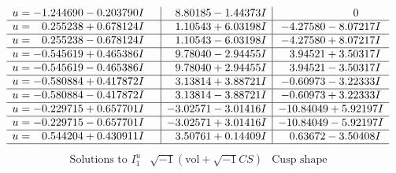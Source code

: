 \documentclass[1p]{elsarticle_modified}
\theoremstyle{definition}
\newcommand{\I}{\sqrt{-1}}
\begin{document}
$$\begin{array}{c|c|c}
\begin{aligned}
u &= -1.244690 - 0.203790 I\end{aligned}
 & \phantom{-}8.80185 - 1.44373 I & \phantom{-0.000000 } 0 \\ \hline\begin{aligned}
u &= \phantom{-}0.255238 + 0.678124 I\end{aligned}
 & \phantom{-}1.10543 + 6.03198 I & -4.27580 - 8.07217 I \\ \hline\begin{aligned}
u &= \phantom{-}0.255238 - 0.678124 I\end{aligned}
 & \phantom{-}1.10543 - 6.03198 I & -4.27580 + 8.07217 I \\ \hline\begin{aligned}
u &= -0.545619 + 0.465386 I\end{aligned}
 & \phantom{-}9.78040 - 2.94455 I & \phantom{-}3.94521 + 3.50317 I \\ \hline\begin{aligned}
u &= -0.545619 - 0.465386 I\end{aligned}
 & \phantom{-}9.78040 + 2.94455 I & \phantom{-}3.94521 - 3.50317 I \\ \hline\begin{aligned}
u &= -0.580884 + 0.417872 I\end{aligned}
 & \phantom{-}3.13814 + 3.88721 I & -0.60973 - 3.22333 I \\ \hline\begin{aligned}
u &= -0.580884 - 0.417872 I\end{aligned}
 & \phantom{-}3.13814 - 3.88721 I & -0.60973 + 3.22333 I \\ \hline\begin{aligned}
u &= -0.229715 + 0.657701 I\end{aligned}
 & -3.02571 - 3.01416 I & -10.84049 + 5.92197 I \\ \hline\begin{aligned}
u &= -0.229715 - 0.657701 I\end{aligned}
 & -3.02571 + 3.01416 I & -10.84049 - 5.92197 I \\ \hline\begin{aligned}
u &= \phantom{-}0.544204 + 0.430911 I\end{aligned}
 & \phantom{-}3.50761 + 0.14409 I & \phantom{-}0.63672 - 3.50408 I\\
 \hline 
 \end{array}$$\newpage$$\begin{array}{c|c|c}  
\text{Solutions to }I^u_{1}& \I (\text{vol} + \sqrt{-1}CS) & \text{Cusp shape}\\

\end{array}$$
\end{document}
